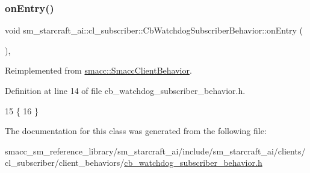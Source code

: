\subsubsection{\texorpdfstring{on\+Entry()}{onEntry()}}
{\footnotesize\ttfamily void sm\+\_\+starcraft\+\_\+ai\+::cl\+\_\+subscriber\+::\+Cb\+Watchdog\+Subscriber\+Behavior\+::on\+Entry (\begin{DoxyParamCaption}{ }\end{DoxyParamCaption})\hspace{0.3cm}{\ttfamily [inline]}, {\ttfamily [virtual]}}



Reimplemented from \hyperlink{classsmacc_1_1SmaccClientBehavior_a7962382f93987c720ad432fef55b123f}{smacc\+::\+Smacc\+Client\+Behavior}.



Definition at line 14 of file cb\+\_\+watchdog\+\_\+subscriber\+\_\+behavior.\+h.


\begin{DoxyCode}
15     \{
16     \}
\end{DoxyCode}


The documentation for this class was generated from the following file\+:\begin{DoxyCompactItemize}
\item 
smacc\+\_\+sm\+\_\+reference\+\_\+library/sm\+\_\+starcraft\+\_\+ai/include/sm\+\_\+starcraft\+\_\+ai/clients/cl\+\_\+subscriber/client\+\_\+behaviors/\hyperlink{sm__starcraft__ai_2include_2sm__starcraft__ai_2clients_2cl__subscriber_2client__behaviors_2cb__wdfb3e50077225b2325e3a32b4e37e7e5}{cb\+\_\+watchdog\+\_\+subscriber\+\_\+behavior.\+h}\end{DoxyCompactItemize}
